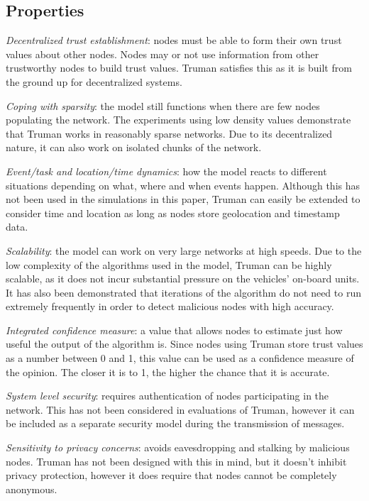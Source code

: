 \documentclass[conference]{IEEEtran}
\begin{document}
\subsection{Properties}
\label{section:properties}

\textit{Decentralized trust establishment}: nodes must be able to form their own trust values about other nodes.
Nodes may or not use information from other trustworthy nodes to build trust values.
Truman satisfies this as it is built from the ground up for decentralized systems.

\textit{Coping with sparsity}: the model still functions when there are few nodes populating the network.
The experiments using low density values demonstrate that Truman works in reasonably sparse networks.
Due to its decentralized nature, it can also work on isolated chunks of the network.

\textit{Event/task and location/time dynamics}: how the model reacts to different situations depending on what, where and when events happen.
Although this has not been used in the simulations in this paper, Truman can easily be extended to consider time and location as long as nodes store geolocation and timestamp data.

\textit{Scalability}: the model can work on very large networks at high speeds.
Due to the low complexity of the algorithms used in the model, Truman can be highly scalable, as it does not incur substantial pressure on the vehicles' on-board units.
It has also been demonstrated that iterations of the algorithm do not need to run extremely frequently in order to detect malicious nodes with high accuracy.

\textit{Integrated confidence measure}: a value that allows nodes to estimate just how useful the output of the algorithm is.
Since nodes using Truman store trust values as a number between 0 and 1, this value can be used as a confidence measure of the opinion.
The closer it is to 1, the higher the chance that it is accurate.

\textit{System level security}: requires authentication of nodes participating in the network.
This has not been considered in evaluations of Truman, however it can be included as a separate security model during the transmission of messages.

\textit{Sensitivity to privacy concerns}: avoids eavesdropping and stalking by malicious nodes.
Truman has not been designed with this in mind, but it doesn't inhibit privacy protection, however it does require that nodes cannot be completely anonymous.
\end{document}
